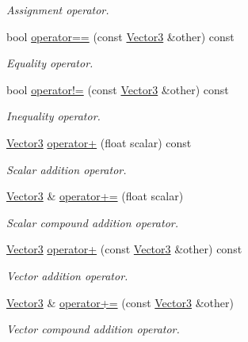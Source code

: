 \begin{DoxyCompactItemize}
\begin{DoxyCompactList}\small\item\em Assignment operator. \end{DoxyCompactList}\item 
bool \hyperlink{classchaos_1_1gfx_1_1_vector3_aea8b9895ae2781f79a02dde0e22a1938}{operator==} (const \hyperlink{classchaos_1_1gfx_1_1_vector3}{Vector3} \&other) const 
\begin{DoxyCompactList}\small\item\em Equality operator. \end{DoxyCompactList}\item 
bool \hyperlink{classchaos_1_1gfx_1_1_vector3_ad8ceb4ba622ba969ab58f163d32f8e6e}{operator!=} (const \hyperlink{classchaos_1_1gfx_1_1_vector3}{Vector3} \&other) const 
\begin{DoxyCompactList}\small\item\em Inequality operator. \end{DoxyCompactList}\item 
\hyperlink{classchaos_1_1gfx_1_1_vector3}{Vector3} \hyperlink{classchaos_1_1gfx_1_1_vector3_a70135c109acc45256567d9c50f160bda}{operator+} (float scalar) const 
\begin{DoxyCompactList}\small\item\em Scalar addition operator. \end{DoxyCompactList}\item 
\hyperlink{classchaos_1_1gfx_1_1_vector3}{Vector3} \& \hyperlink{classchaos_1_1gfx_1_1_vector3_acb76c6c076cc7448503b09edab578569}{operator+=} (float scalar)
\begin{DoxyCompactList}\small\item\em Scalar compound addition operator. \end{DoxyCompactList}\item 
\hyperlink{classchaos_1_1gfx_1_1_vector3}{Vector3} \hyperlink{classchaos_1_1gfx_1_1_vector3_a94c67b5eb0b4bba1732019bc9eef459f}{operator+} (const \hyperlink{classchaos_1_1gfx_1_1_vector3}{Vector3} \&other) const 
\begin{DoxyCompactList}\small\item\em Vector addition operator. \end{DoxyCompactList}\item 
\hyperlink{classchaos_1_1gfx_1_1_vector3}{Vector3} \& \hyperlink{classchaos_1_1gfx_1_1_vector3_a05bb1715123edd7d137ebe2277d0b16f}{operator+=} (const \hyperlink{classchaos_1_1gfx_1_1_vector3}{Vector3} \&other)
\begin{DoxyCompactList}\small\item\em Vector compound addition operator. \end{DoxyCompactList}\item 

\end{DoxyCompactItemize}
